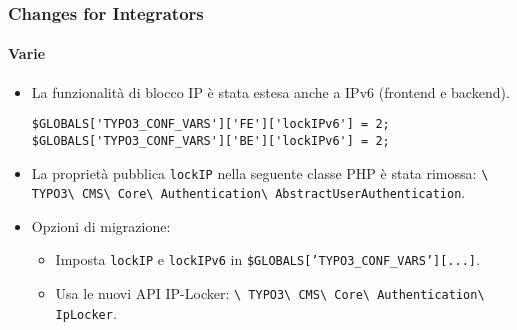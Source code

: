 \begin{frame}[fragile]
	\frametitle{Changes for Integrators}
	\framesubtitle{Varie}

	\lstset{basicstyle=\tiny\ttfamily}

	\begin{itemize}

		\item  La funzionalità di blocco IP è stata estesa anche a IPv6
			(frontend e backend).

\begin{lstlisting}
$GLOBALS['TYPO3_CONF_VARS']['FE']['lockIPv6'] = 2;
$GLOBALS['TYPO3_CONF_VARS']['BE']['lockIPv6'] = 2;
\end{lstlisting}

		\item La proprietà pubblica \texttt{lockIP} nella seguente classe PHP è stata rimossa:\newline
			\small
				\texttt{\textbackslash
					TYPO3\textbackslash
					CMS\textbackslash
					Core\textbackslash
					Authentication\textbackslash
					AbstractUserAuthentication}.
			\normalsize

		\item Opzioni di migrazione:

			\begin{itemize}\smaller
				\item[\ding{228}] Imposta \texttt{lockIP} e \texttt{lockIPv6} in \texttt{\$GLOBALS['TYPO3\_CONF\_VARS'][...]}.
				\item[\ding{228}] Usa le nuovi API IP-Locker:
					\texttt{\textbackslash
						TYPO3\textbackslash
						CMS\textbackslash
						Core\textbackslash
						Authentication\textbackslash
						IpLocker}.
			\end{itemize}\normalsize


	\end{itemize}

\end{frame}

